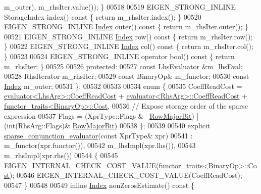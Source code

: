 \begin{DoxyCode}
      m\_outer), m\_rhsIter.value()); \}
00518 
00519     EIGEN\_STRONG\_INLINE StorageIndex index()\textcolor{keyword}{ const }\{ \textcolor{keywordflow}{return} m\_rhsIter.index(); \}
00520     EIGEN\_STRONG\_INLINE \hyperlink{namespace_eigen_a62e77e0933482dafde8fe197d9a2cfde}{Index} outer()\textcolor{keyword}{ const }\{ \textcolor{keywordflow}{return} m\_rhsIter.outer(); \}
00521     EIGEN\_STRONG\_INLINE \hyperlink{namespace_eigen_a62e77e0933482dafde8fe197d9a2cfde}{Index} row()\textcolor{keyword}{ const }\{ \textcolor{keywordflow}{return} m\_rhsIter.row(); \}
00522     EIGEN\_STRONG\_INLINE \hyperlink{namespace_eigen_a62e77e0933482dafde8fe197d9a2cfde}{Index} col()\textcolor{keyword}{ const }\{ \textcolor{keywordflow}{return} m\_rhsIter.col(); \}
00523 
00524     EIGEN\_STRONG\_INLINE \textcolor{keyword}{operator} bool()\textcolor{keyword}{ const }\{ \textcolor{keywordflow}{return} m\_rhsIter; \}
00525     
00526   \textcolor{keyword}{protected}:
00527     \textcolor{keyword}{const} LhsEvaluator &m\_lhsEval;
00528     RhsIterator m\_rhsIter;
00529     \textcolor{keyword}{const} BinaryOp& m\_functor;
00530     \textcolor{keyword}{const} \hyperlink{namespace_eigen_a62e77e0933482dafde8fe197d9a2cfde}{Index} m\_outer;
00531   \};
00532   
00533   
00534   \textcolor{keyword}{enum} \{
00535     CoeffReadCost = \hyperlink{struct_eigen_1_1internal_1_1evaluator}{evaluator<LhsArg>::CoeffReadCost} + 
      \hyperlink{struct_eigen_1_1internal_1_1evaluator}{evaluator<RhsArg>::CoeffReadCost} + 
      \hyperlink{struct_eigen_1_1internal_1_1functor__traits}{functor\_traits<BinaryOp>::Cost},
00536     \textcolor{comment}{// Expose storage order of the sparse expression}
00537     Flags = (XprType::Flags & ~\hyperlink{group__flags_gae4f56c2a60bbe4bd2e44c5b19cbe8762}{RowMajorBit}) | (\textcolor{keywordtype}{int}(RhsArg::Flags)&
      \hyperlink{group__flags_gae4f56c2a60bbe4bd2e44c5b19cbe8762}{RowMajorBit})
00538   \};
00539   
00540   \textcolor{keyword}{explicit} \hyperlink{struct_eigen_1_1internal_1_1sparse__conjunction__evaluator}{sparse\_conjunction\_evaluator}(\textcolor{keyword}{const} XprType& xpr)
00541     : m\_functor(xpr.functor()),
00542       m\_lhsImpl(xpr.lhs()), 
00543       m\_rhsImpl(xpr.rhs())  
00544   \{
00545     EIGEN\_INTERNAL\_CHECK\_COST\_VALUE(\hyperlink{struct_eigen_1_1internal_1_1functor__traits}{functor\_traits<BinaryOp>::Cost});
00546     EIGEN\_INTERNAL\_CHECK\_COST\_VALUE(CoeffReadCost);
00547   \}
00548   
00549   \textcolor{keyword}{inline} \hyperlink{namespace_eigen_a62e77e0933482dafde8fe197d9a2cfde}{Index} nonZerosEstimate()\textcolor{keyword}{ const }\{

\end{DoxyCode}
